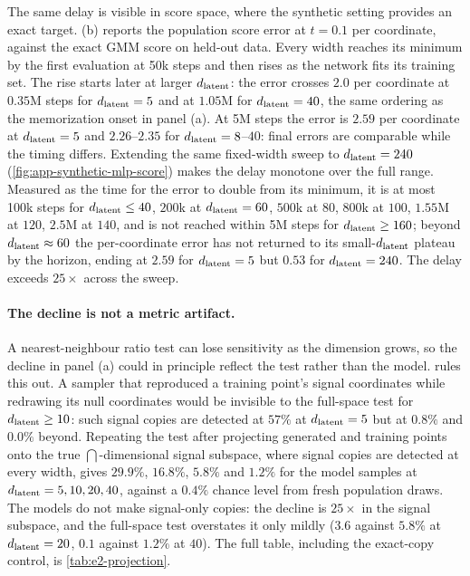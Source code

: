 The same delay is visible in score space, where the synthetic setting provides an exact target. (b) reports the population score error at $t=0.1$ per coordinate, against the exact GMM score on held-out data. Every width reaches its minimum by the first evaluation at 50k steps and then rises as the network fits its training set. The rise starts later at larger $d_{\mathrm{latent}}$: the error crosses $2.0$ per coordinate at $0.35$M steps for $d_{\mathrm{latent}}=5$ and at $1.05$M for $d_{\mathrm{latent}}=40$, the same ordering as the memorization onset in panel (a). At 5M steps the error is $2.59$ per coordinate at $d_{\mathrm{latent}}=5$ and $2.26$--$2.35$ for $d_{\mathrm{latent}}=8$--$40$: final errors are comparable while the timing differs. Extending the same fixed-width sweep to $d_{\mathrm{latent}}=240$ (\cref{fig:app-synthetic-mlp-score}) makes the delay monotone over the full range. Measured as the time for the error to double from its minimum, it is at most 100k steps for $d_{\mathrm{latent}}\le40$, $200$k at $d_{\mathrm{latent}}=60$, $500$k at $80$, $800$k at $100$, $1.55$M at $120$, $2.5$M at $140$, and is not reached within 5M steps for $d_{\mathrm{latent}}\ge160$; beyond $d_{\mathrm{latent}}\approx60$ the per-coordinate error has not returned to its small-$d_{\mathrm{latent}}$ plateau by the horizon, ending at $2.59$ for $d_{\mathrm{latent}}=5$ but $0.53$ for $d_{\mathrm{latent}}=240$. The delay exceeds $25\times$ across the sweep.

\paragraph{The decline is not a metric artifact.}
A nearest-neighbour ratio test can lose sensitivity as the dimension grows, so the decline in panel (a) could in principle reflect the test rather than the model.  rules this out. A sampler that reproduced a training point's signal coordinates while redrawing its null coordinates would be invisible to the full-space test for $d_{\mathrm{latent}}\ge10$: such signal copies are detected at $57\%$ at $d_{\mathrm{latent}}=5$ but at $0.8\%$ and $0.0\%$ beyond. Repeating the test after projecting generated and training points onto the true $\dint$-dimensional signal subspace, where signal copies are detected at every width, gives $29.9\%$, $16.8\%$, $5.8\%$ and $1.2\%$ for the model samples at $d_{\mathrm{latent}}=5,10,20,40$, against a $0.4\%$ chance level from fresh population draws. The models do not make signal-only copies: the decline is $25\times$ in the signal subspace, and the full-space test overstates it only mildly ($3.6$ against $5.8\%$ at $d_{\mathrm{latent}}=20$, $0.1$ against $1.2\%$ at $40$). The full table, including the exact-copy control, is \cref{tab:e2-projection}.

